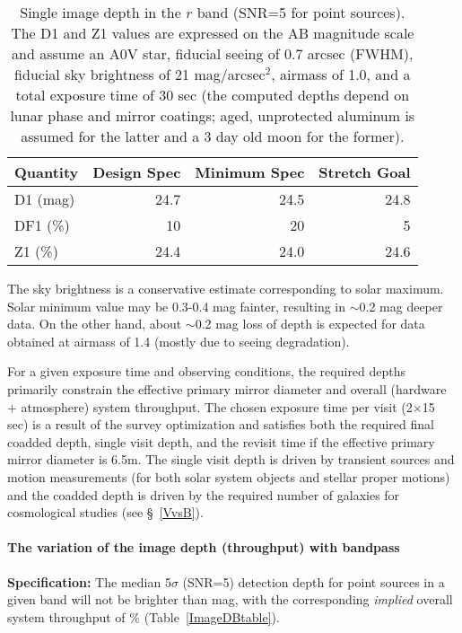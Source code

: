 \begin{table}[h]
\label{tsi}
\begin{tabular}{|l|r|r|r|}
\hline
Quantity        & Design Spec & Minimum Spec & Stretch Goal   \\
\hline
      D1 (mag)  &    24.7     &     24.5    &     24.8        \\
      DF1 (\%)  &    10       &      20     &       5         \\
      Z1  (\%)  &    24.4     &     24.0    &     24.6        \\
\hline
\end{tabular}
\caption{Single image depth in the $r$ band (SNR=5 for point sources).  The
D1 and Z1 values are expressed on the AB magnitude scale
and assume an A0V star, fiducial seeing of 0.7 arcsec (FWHM), fiducial sky
brightness of 21 mag/arcsec$^2$, airmass of 1.0, and a total exposure time
of 30 sec (the computed depths depend on lunar phase and mirror coatings;
aged, unprotected aluminum is assumed for the latter and a 3 day old moon
for the former).} The sky brightness is a conservative estimate corresponding
to solar maximum. Solar minimum value may be 0.3-0.4 mag fainter, resulting
in $\sim$0.2 mag deeper data. On the other hand, about  $\sim$0.2 mag loss
of depth is expected for data obtained at airmass of 1.4 (mostly due to
seeing degradation).
\label{ImageDtable}
\end{table}

For a given exposure time and observing conditions, the required depths
primarily constrain the effective primary mirror diameter and overall
(hardware $+$ atmosphere) system throughput. The chosen exposure time per visit
(2$\times$15 sec) is a result of the survey optimization and satisfies
both the required final coadded depth, single visit depth, and the revisit
time if the effective primary mirror diameter is 6.5m.
The single visit depth is driven by transient sources and motion measurements
(for both solar system objects and stellar proper motions) and the coadded
depth is driven by the required number of galaxies for cosmological studies
(see \S~\ref{VvsB}).



\paragraph{The variation of the image depth (throughput) with bandpass\\}

{\bf Specification:} The median 5$\sigma$ (SNR=5) detection
depth for point sources in a given band will not be brighter than
mag, with the corresponding {\it implied} overall system throughput of
\% (Table~\ref{ImageDBtable}).

